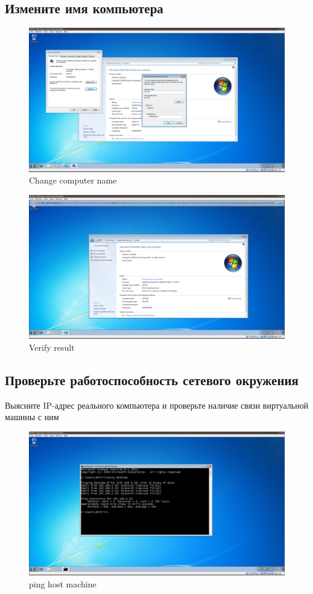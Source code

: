 \documentclass[a4paper]{article}
\begin{document}
\subsection{Измените имя компьютера}
\begin{figure}[H]
    \centering
    \includegraphics[width=\linewidth]{45.png}
    \caption{Change computer name}
\end{figure}
\begin{figure}[H]
    \centering
    \includegraphics[width=\linewidth]{51.png}
    \caption{Verify result}
\end{figure}

\subsection{Проверьте работоспособность сетевого окружения}
Выясните IP-адрес реального компьютера и проверьте наличие связи виртуальной машины с ним
\begin{figure}[H]
    \centering
    \includegraphics[width=\linewidth]{47.png}
    \caption{ping host machine}
\end{figure}
\end{document}

